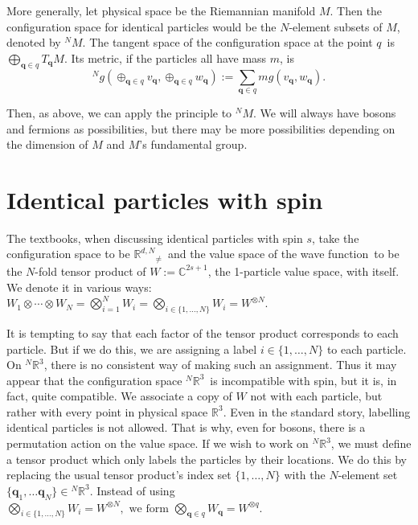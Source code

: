 \documentclass[11pt]{article}
\theoremstyle{remark}
\begin{document}
More generally, let physical space be the Riemannian manifold $M$. Then
the configuration space for identical particles would be the
$N$-element subsets of $M$, denoted by \ensuremath{{}^{N}\! {M}}. The 
tangent space of
the configuration space at the point \ensuremath{q}\ 
is $\bigoplus_{\ensuremath{\boldsymbol{q}} \in \ensuremath{q}} T_{\ensuremath{\boldsymbol{q}}}M$. Its metric, if the
particles all have mass $m$, is
\begin{equation*} 
\ensuremath{{}^{N}\! {g}}(\mathop{\oplus}_{\ensuremath{\boldsymbol{q}} \in \ensuremath{q}} v_{\ensuremath{\boldsymbol{q}}}, \mathop{\oplus}_{\ensuremath{\boldsymbol{q}}
\in \ensuremath{q}} w_{\ensuremath{\boldsymbol{q}}})
\ensuremath{:=} \sum_{\ensuremath{\boldsymbol{q}} \in \ensuremath{q}} m g(v_{\ensuremath{\boldsymbol{q}}},w_{\ensuremath{\boldsymbol{q}}}).
\end{equation*} 

Then, as above, we can apply the principle to \ensuremath{{}^{N}\! {M}}. 
We will always have bosons and fermions as
possibilities, but there may be more possibilities depending on the
dimension of $M$ and $M$'s fundamental group.  


\section{Identical particles with spin} \label{s:nspin}


The textbooks, when discussing identical particles with spin $s$, take 
the configuration space to be \ensuremath{\ensuremath{\mathbb{R}^{d,N}}_{\neq}}\ and the value space of the wave function\ to
be the $N$-fold tensor product of $W \ensuremath{:=} \ensuremath{\mathbb{C}}^{2s+1}$, the
1-particle value space, with itself. We denote it in various ways:
$
 W_1 \otimes \cdots \otimes W_N 
=  \bigotimes_{i=1}^{N} W_i = \bigotimes_{i \in 
\{1, \ldots, N \}} W_i = W^{\otimes N}.
$

It is tempting to say that each factor of the tensor product
corresponds to each particle. But if we do this, we are
assigning a label  $i \in \{1, \ldots, N\}$ to each particle. On \ensuremath{{}^N\ensuremath{\mathbb{R}^{3}}},
there is no consistent way of making such an assignment. 
Thus it may appear that the configuration space \ensuremath{{}^N\ensuremath{\mathbb{R}^{3}}}\ is incompatible
with spin, but it is, in fact, quite compatible. 
We associate a copy
of $W$ not with each particle, but rather with every
point in physical space $\ensuremath{\mathbb{R}^{3}}$. 
Even in the
standard story,  labelling identical particles is not allowed. 
That is why, even for bosons, there is a permutation
action on the value space. If we wish to work on
\ensuremath{{}^N\ensuremath{\mathbb{R}^{3}}}, we must define a tensor product which only labels the particles
by their locations.
We do this by replacing the usual  tensor product's 
index set $\{1, \ldots, N\}$  
with the $N$-element set $\{ \ensuremath{\boldsymbol{q}}_1, \ldots \ensuremath{\boldsymbol{q}}_N\} \in \ensuremath{{}^N\ensuremath{\mathbb{R}^{3}}}$. 
Instead of using
$\bigotimes_{i \in 
\{1, \ldots, N \}} W_i = W^{\otimes N},
\text{ we form } \bigotimes_{\ensuremath{\boldsymbol{q}} \in 
\ensuremath{q}} W_{\ensuremath{\boldsymbol{q}}} = W^{\otimes \ensuremath{q}}.
$
\end{document}
